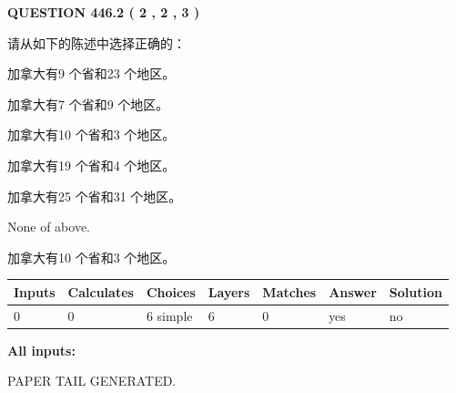 \documentclass{ctexart}
\begin{document}
   
  
\vspace{0.2in}
  
{\textbf{\Large{QUESTION
446.2 
 ( 2 , 2 , 3 )
}}}
  
  
请从如下的陈述中选择正确的：
 
 
加拿大有9 个省和23 个地区。
 
 
加拿大有7 个省和9 个地区。
 
 
加拿大有10 个省和3 个地区。
 
 
加拿大有19 个省和4 个地区。
 
 
加拿大有25 个省和31 个地区。
 
 
 None of above.
 
 
\noindent{}
 
 
加拿大有10 个省和3 个地区。
 
 
\noindent{}
 
 
   
   
   
   
\noindent\begin{tabular}{|l|l|l|l|l|l|l|}
 \hline
Inputs & Calculates & Choices & Layers & Matches & Answer & Solution \\ \hline
 0  & 
 0  & 
 6
  simple  
  & 
 6  & 
 0  & 
  yes & 
  no 
  \\ \hline
 \end{tabular}
   
   
   
   
\noindent{}
   
   
   
   
\noindent\vspace{0.1in}\hspace{-0.08in} {\textbf{\Large{All inputs: }}}
   
   
   
   
   
   
 \vspace{0.2in}
 
   
   
\vspace{2.0in} PAPER TAIL GENERATED.
   
\end{document}
